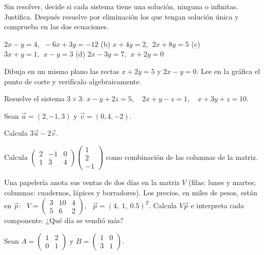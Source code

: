 \documentclass[11pt,a4paper]{article}
\begin{document}
\taller
\begin{ejercicios}[itemsep=6pt]
\item Sin resolver, decide si cada sistema tiene una solución, ninguna o infinitas. Justifica. Después resuelve
  por eliminación los que tengan solución única y comprueba en las dos ecuaciones.
  \begin{ejercicios}
  \item $2x-y=4,\ \ -6x+3y=-12$ \quad (b) $x+4y=2,\ \ 2x+8y=5$ \quad (c) $3x+y=1,\ \ x-y=3$ \quad (d) $2x-3y=7,\ \ x+2y=0$
  \end{ejercicios}
\item Dibuja en un mismo plano las rectas $x+2y=5$ y $2x-y=0$. Lee en la gráfica el punto de corte y verifícalo
  algebraicamente.
\item Resuelve el sistema $3\times3$: \quad $x-y+2z=5,\quad 2x+y-z=1,\quad x+3y+z=10$.
\item Sean $\vec u=(2,-1,3)$ y $\vec v=(0,4,-2)$.
  \begin{ejercicios}
  \item Calcula $3\vec u-2\vec v$.
  \item Calcula $\begin{pmatrix} 2 & -1 & 0\\ 1 & 3 & 4 \end{pmatrix}\begin{pmatrix} 1\\ 2\\ -1 \end{pmatrix}$ como combinación de las columnas de la matriz.
  \end{ejercicios}
\item Una papelería anota sus ventas de dos días en la matriz $V$ (filas: lunes y martes; columnas: cuadernos,
  lápices y borradores). Los precios, en miles de pesos, están en $\vec p$:
  \ $V=\begin{pmatrix} 3 & 10 & 4\\ 5 & 6 & 2 \end{pmatrix}$, \ $\vec p=(4,\ 1,\ 0.5)^T$.
  Calcula $V\vec p$ e interpreta cada componente. ¿Qué día se vendió más?
\item Sean $A=\begin{pmatrix} 1 & 2\\ 0 & 1 \end{pmatrix}$ y $B=\begin{pmatrix} 1 & 0\\ 3 & 1 \end{pmatrix}$.

\end{ejercicios}
\end{document}
